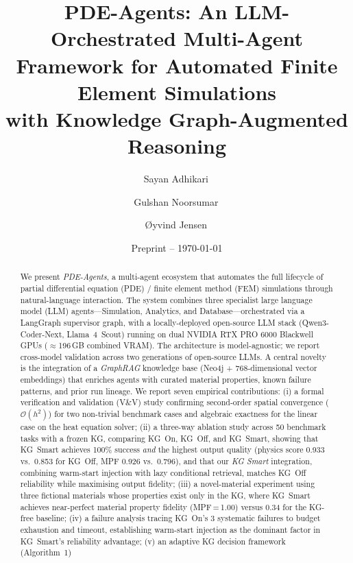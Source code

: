 \documentclass[twocolumn]{article}
\title{\textbf{PDE-Agents: An LLM-Orchestrated Multi-Agent\\
       Framework for Automated Finite Element Simulations\\
       with Knowledge Graph-Augmented Reasoning}}
\author[1]{Sayan Adhikari\,\orcidlink{0000-0002-9316-3292}}
\author[1]{Gulshan Noorsumar\,\orcidlink{0000-0002-6718-4508}}
\author[1]{\O yvind Jensen\,\orcidlink{0000-0003-4353-9359}}
\affil[1]{Institute for Energy Technology (IFE), Kjeller, Norway}
\date{Preprint -- \today}
\begin{document}
\maketitle

\let\thefootnote\relax{}

\begin{abstract}
We present \textit{PDE-Agents}, a multi-agent ecosystem that automates the
full lifecycle of partial differential equation (PDE) / finite element method
(FEM) simulations through natural-language interaction.  The system combines three specialist large language model (LLM)
agents—Simulation, Analytics, and Database—orchestrated via a LangGraph
supervisor graph, with a locally-deployed open-source LLM stack
(Qwen3-Coder-Next, Llama~4~Scout) running on dual NVIDIA RTX PRO 6000
Blackwell GPUs ($\approx$196\,GB combined VRAM).  The architecture is
model-agnostic; we report cross-model validation across two
generations of open-source LLMs.
A central novelty is the integration of a \emph{GraphRAG} knowledge base
(Neo4j + 768-dimensional vector embeddings) that enriches agents with curated
material properties, known failure patterns, and prior run lineage.
We report seven empirical contributions: (i) a formal verification and
validation (V\&V) study confirming second-order spatial convergence (\(\mathcal{O}(h^2)\))
for two non-trivial benchmark cases and algebraic exactness for the
linear case on the heat equation solver; (ii) a
three-way ablation study across 50 benchmark tasks with a frozen KG,
comparing KG~On, KG~Off, and KG~Smart,
showing that KG~Smart achieves 100\% success \emph{and} the highest
output quality (physics score 0.933 vs.\ 0.853 for KG~Off,
 MPF 0.926 vs.\ 0.796), and that our \emph{KG Smart}
integration, combining warm-start injection with lazy conditional
retrieval, matches KG~Off reliability while maximising output fidelity;
(iii) a novel-material experiment using three fictional materials
whose properties exist only in the KG, where KG~Smart achieves
near-perfect material property fidelity (MPF\,=\,1.00) versus 0.34 for the
KG-free baseline; (iv) a failure analysis tracing KG~On's 3 systematic failures to budget
exhaustion and timeout, establishing warm-start injection as the dominant
factor in KG~Smart's reliability advantage;
(v) an adaptive KG decision framework (Algorithm~1)

\end{abstract}
\end{document}

